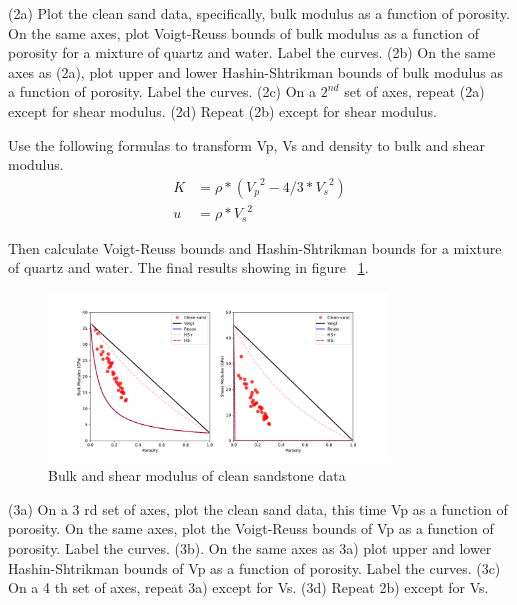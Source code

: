 \begin{problem}{2}
    (2a) Plot the clean sand data, specifically, bulk modulus as a function of porosity. On the same axes, plot Voigt-Reuss bounds of bulk modulus as a function of porosity for a mixture of quartz and water. Label the curves.
    (2b) On the same axes as (2a), plot upper and lower Hashin-Shtrikman bounds of bulk modulus as a function of porosity. Label the curves.
    (2c) On a $2^{nd}$ set of axes, repeat (2a) except for shear modulus.
    (2d) Repeat (2b) except for shear modulus.
\end{problem}

\begin{solution}

Use the following formulas to transform Vp, Vs and density to bulk and shear modulus.
\begin{align}
    K & = \rho * ({V_p}^2 - 4/3 * {V_s}^2)\\
    u & = \rho  * {V_s}^2
    \label{equ:K-u-modulus}
\end{align}

Then calculate Voigt-Reuss bounds and Hashin-Shtrikman bounds for a mixture of quartz and water.
The final results showing in figure ~\ref{fig:p1-problem-2}.

\begin{figure}[h]
    \centering
    \includegraphics[width=0.8\textwidth]{figures/homework-1/p1-problem-2.pdf}
    \caption{Bulk and shear modulus of clean sandstone data}
    \label{fig:p1-problem-2}
\end{figure}
\end{solution}


\begin{problem}{3}
    (3a) On a 3 rd set of axes, plot the clean sand data, this time Vp as a function of porosity. On the same axes, plot the Voigt-Reuss bounds of Vp as a function of porosity. Label the curves.
    (3b). On the same axes as 3a) plot upper and lower Hashin-Shtrikman bounds of Vp as a function of porosity. Label the curves.
    (3c) On a 4 th set of axes, repeat 3a) except for Vs.
    (3d) Repeat 2b) except for Vs.
\end{problem}

